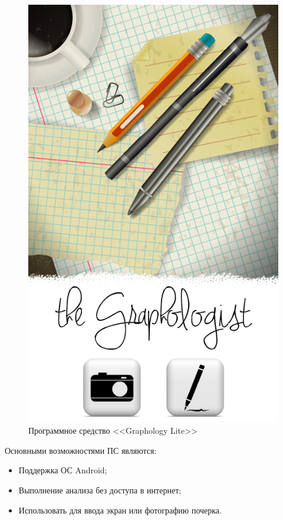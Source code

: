 \begin{figure}[h]
    \centering
    \label{fig:domain:analogs:graphology_lite}
    \includegraphics[height=0.5\textheight]{figures/analog_graphology_lite.png}
    \caption{Программное средство <<Graphology Lite>>}
\end{figure}

Основными возможностями ПС являются:
\begin{itemize}
  \item Поддержка ОС Android;
  \item Выполнение анализа без доступа в интернет;
  \item Использовать для ввода экран или фотографию почерка.
\end{itemize}

